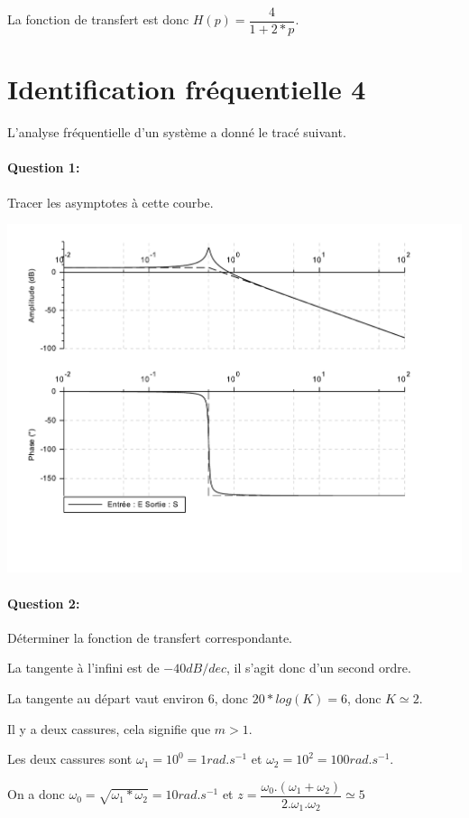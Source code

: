 La fonction de transfert est donc $H(p)=\dfrac{4}{1+2*p}$.

\newpage

\section{Identification fréquentielle 4}

L'analyse fréquentielle d'un système a donné le tracé suivant.

\paragraph{Question 1:} Tracer les asymptotes à cette courbe.

\begin{center}
 \includegraphics[width=0.8\linewidth]{img/Bode3_c}
\end{center} 

\paragraph{Question 2:} Déterminer la fonction de transfert correspondante.

La tangente à l'infini est de $-40dB/dec$, il s'agit donc d'un second ordre.

La tangente au départ vaut environ $6$, donc $20*log(K)=6$, donc $K\simeq 2$.

Il y a deux cassures, cela signifie que $m>1$.

Les deux cassures sont $\omega_1=10^0=1 rad.s^{-1}$ et $\omega_2=10^2=100 rad.s^{-1}$.

On a donc $\omega_0=\sqrt{\omega_1*\omega_2}=10rad.s^{-1}$ et $z=\dfrac{\omega_0.(\omega_1+\omega_2)}{2.\omega_1.\omega_2}\simeq 5$

